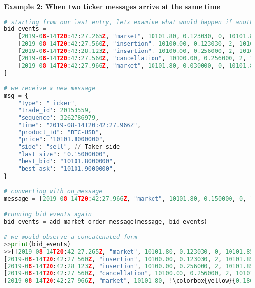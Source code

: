 \textbf{Example 2: When two ticker messages arrive at the same time}
\begin{lstlisting}[escapechar=!, language=Python]
# starting from our last entry, lets examine what would happen if another ticker message containing a market order with an identical timestamp were to be received from the event loop.
bid_events = [
	[2019-08-14T20:42:27.265Z, "market", 10101.80, 0.123030, 0, 10101.85, 0.10],
	[2019-08-14T20:42:27.560Z, "insertion", 10100.00, 0.123030, 2, 10101.85, 0.10],
	[2019-08-14T20:42:28.123Z, "insertion", 10100.00, 0.256000, 2, 10101.85, 0.10],
	[2019-08-14T20:42:27.560Z, "cancellation", 10100.00, 0.256000, 2, 10101.85, 0.10],
	[2019-08-14T20:42:27.966Z, "market", 10101.80, 0.030000, 0, 10101.85, 0.10]
]

# we receive a new message
msg = {
	"type": "ticker",
	"trade_id": 20153559,
	"sequence": 3262786979,
	"time": "2019-08-14T20:42:27.966Z",
	"product_id": "BTC-USD",
	"price": "10101.8000000",
	"side": "sell", // Taker side
	"last_size": "0.15000000",
	"best_bid": "10101.8000000",
	"best_ask": "10101.9000000",
}

# converting with on_message
message = [2019-08-14T20:42:27.966Z, "market", 10101.80, 0.150000, 0, 10101.85, 0.10]

#running bid events again
bid_events = add_market_order_message(message, bid_events)

# we would observe a concatenated form
>>print(bid_events)
>>[[2019-08-14T20:42:27.265Z, "market", 10101.80, 0.123030, 0, 10101.85,  0.10],
[2019-08-14T20:42:27.560Z, "insertion", 10100.00, 0.123030, 2, 10101.85, 0.10],
[2019-08-14T20:42:28.123Z, "insertion", 10100.00, 0.256000, 2, 10101.85, 0.10],
[2019-08-14T20:42:27.560Z, "cancellation", 10100.00, 0.256000, 2, 10101.85, 0.10],
[2019-08-14T20:42:27.966Z, "market", 10101.80, !\colorbox{yellow}{0.180000}!, 0, 10101.85, 0.10]]


\end{lstlisting}